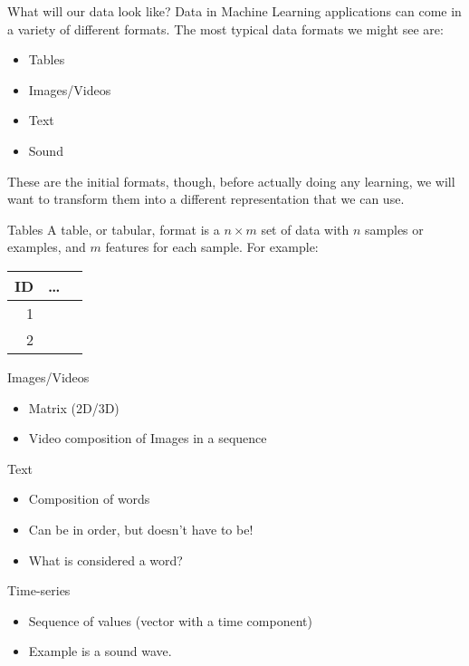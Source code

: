 \documentclass[10pt]{beamer}
\begin{document}
\begin{frame}[label={sec:orgc77f316}]{What will our data look like?}
Data in Machine Learning applications can come in a variety of different formats. The
most typical data formats we might see are:

\begin{itemize}
\item Tables
\item Images/Videos
\item Text
\item Sound
\end{itemize}

These are the initial formats, though, before actually doing any learning, we will
want to transform them into a different representation that we can use.
\end{frame}

\begin{frame}[label={sec:org2888843}]{Tables}
A table, or tabular, format is a \(n \times m\) set of data with \(n\) samples or
examples, and \(m\) features for each sample. For example:
\begin{center}
\begin{tabular}{rll}
ID & \ldots{} & \\
\hline
1 &  & \\
2 &  & \\
\end{tabular}
\end{center}
\end{frame}

\begin{frame}[label={sec:org19253ff}]{Images/Videos}
\begin{itemize}
\item Matrix (2D/3D)
\item Video composition of Images in a sequence
\end{itemize}
\end{frame}

\begin{frame}[label={sec:org976114e}]{Text}
\begin{itemize}
\item Composition of words
\item Can be in order, but doesn't have to be!
\item What is considered a word?
\end{itemize}
\end{frame}

\begin{frame}[label={sec:org4521d7f}]{Time-series}
\begin{itemize}
\item Sequence of values (vector with a time component)
\item Example is a sound wave.
\end{itemize}
\end{frame}
\end{document}

